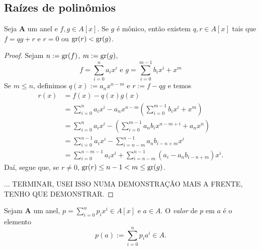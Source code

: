 

\subsection{Raízes de polinômios}

\begin{proposition}
Seja $\bm A$ um anel e $f,g \in A[x]$. Se $g$ é mônico, então existem $q,r \in A[x]$ tais que $f=qg+r$ e $r=0$ ou $\operatorname{gr}(r) < \operatorname{gr}(g)$.
\end{proposition}
\begin{proof}
Sejam $n := \operatorname{gr}(f)$, $m := \operatorname{gr}(g)$,
	\begin{equation*}
	f = \sum_{i=0}^n a_ix^i \text{\ \ e\ \ } g = \sum_{i=0}^{m-1} b_ix^i + x^m
	\end{equation*}
Se $m \leq n$, definimos $q(x) := a_nx^{n-m}$ e $r := f-qg$ e temos
	\begin{align*}
	r(x) &= f(x) - q(x)g(x) \\
	&= \sum_{i=0}^n a_ix^i - a_nx^{n-m}\left(\sum_{i=0}^{m-1} b_ix^i + x^m\right) \\
	&= \sum_{i=0}^n a_ix^i - \left(\sum_{i=0}^{m-1} a_nb_ix^{n-m+i} + a_nx^n\right) \\
	&= \sum_{i=0}^{n-1} a_ix^i - \sum_{i=n-m}^{n-1} a_nb_{i-n+m}x^i \\
	&= \sum_{i=0}^{n-m-1} a_ix^i + \sum_{i=n-m}^{n-1} (a_i - a_nb_{i-n+m})x^i.
	\end{align*}
Daí, segue que, se $r \neq 0$, $\operatorname{gr}(r) \leq n-1 < m  \leq \operatorname{gr}(g)$.

... TERMINAR, USEI ISSO NUMA DEMONSTRAÇÃO MAIS A FRENTE, TENHO QUE DEMONSTRAR.
\end{proof}

\begin{definition}
Sejam $\bm A$ um anel, $p = \sum_{i=0}^n p_ix^i \in A[x]$ e $a \in A$. O \emph{valor} de $p$ em $a$ é o elemento
	\begin{equation*}
	p(a) := \sum_{i=0}^n p_ia^i \in A.
	\end{equation*}
\end{definition}


